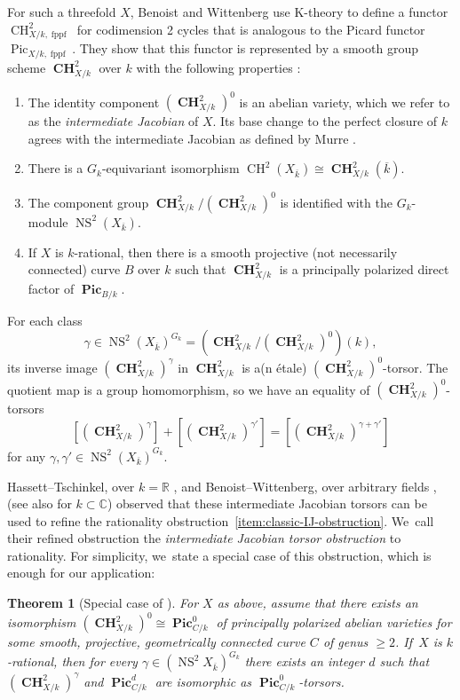 \documentclass[JEP,XML,SOM,Unicode,NoEqCountersInSection,published]{cedram}
\let\bb\mathbb\let\Bbb\mathbb
\theoremstyle{plain}
\newtheorem{thm}{Theorem}[section]
\theoremstyle{definition}
\DeclareMathOperator{\CH}{CH}
\DeclareMathOperator{\bCH}{\mathbf{CH}}
\DeclareMathOperator{\fppf}{fppf}
\DeclareMathOperator{\NS}{NS}
\DeclareMathOperator{\Pic}{Pic}
\DeclareMathOperator{\bPic}{\mathbf{Pic}}
\newcommand{\defi}[1]{\emph{#1}}
\newcommand{\kbar}{{\overline{k}}}
\begin{document}
For such a threefold \(X\), Benoist and Wittenberg use K-theory to define a functor \(\CH^2_{X/k,\fppf}\) for codimension 2 cycles that is analogous to the Picard functor \(\Pic_{X/k,\fppf}\). They show that this functor is represented by a smooth group scheme \(\bCH^2_{X/k}\) over \(k\) with the following properties \cite[Th.\,3.1]{BW-IJ}:
\begin{enumerate}
\item The identity component \((\bCH^2_{X/k})^0\) is an abelian variety, which we refer to as the \defi{intermediate Jacobian} of \(X\). Its base change to the perfect closure of \(k\) agrees with the intermediate Jacobian as defined by Murre \cite{Murre85,ACMV-descend}.
\item There is a \(G_k\)-equivariant isomorphism \(\CH^2(X_{\kbar})\cong\bCH^2_{X/k}(\kbar)\).
\item The component group \(\bCH^2_{X/k}/(\bCH^2_{X/k})^0\) is identified with the \(G_k\)-module \(\NS^2(X_\kbar)\).
\item\label{item:classic-IJ-obstruction} If \(X\) is \(k\)-rational, then there is a smooth projective (not necessarily connected) curve \(B\) over \(k\) such that \(\bCH^2_{X/k}\) is a principally polarized direct factor of \(\bPic_{B/k}\).
\end{enumerate}
For each class 
\[
\gamma\in\NS^2(X_{\kbar})^{G_k}=(\bCH^2_{X/k}/(\bCH^2_{X/k})^0)(k),
\]
its inverse image \((\bCH^2_{X/k})^\gamma\) in \(\bCH^2_{X/k}\) is a(n étale) \((\bCH^2_{X/k})^0\)-torsor. The quotient map is a group homomorphism, so we have an equality of \((\bCH^2_{X/k})^0\)-torsors
\[
[(\bCH^2_{X/k})^\gamma] + [(\bCH^2_{X/k})^{\gamma'}] = [(\bCH^2_{X/k})^{\gamma+\gamma'}]
\]
for any \(\gamma,\gamma'\in\NS^2(X_{\kbar})^{G_k}\).

Hassett--Tschinkel, over \(k=\bb R\) \cite{HT-intersection-quadrics}, and Benoist--Wittenberg, over arbitrary fields \cite{BW-IJ}, (see also \cite{HT-cycle} for \(k\subset\bb C\)) observed that these intermediate Jacobian torsors can be used to refine the rationality obstruction~\eqref{item:classic-IJ-obstruction}. We~call their refined obstruction the \defi{intermediate Jacobian torsor obstruction} to rationality. For simplicity, we~state a special case of this obstruction, which is enough for our application:

\begin{thm}[{Special case of \cite[Th.\,3.11]{BW-IJ}}]\label{thm-BWIJ}
For \(X\) as above, assume that there exists an isomorphism \((\bCH^2_{X/k})^0\cong\bPic^0_{C/k}\) of principally polarized abelian varieties for some smooth, projective, geometrically connected curve \(C\) of genus \(\geq 2\). If~\(X\) is \(k\)-rational, then for every \(\gamma\in(\NS^2 X_{\kbar})^{G_k}\) there exists an integer \(d\) such that \((\bCH^2_{X/k})^\gamma\) and \(\bPic^d_{C/k}\) are isomorphic as \(\bPic^0_{C/k}\)-torsors.
\end{thm}
\end{document}
